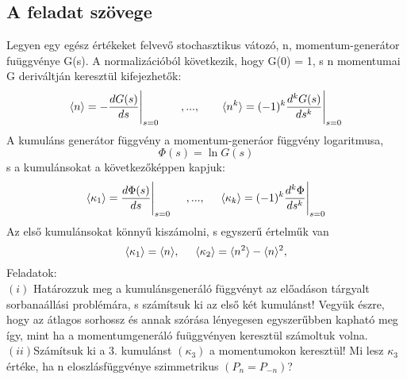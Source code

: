 \documentclass[12pt]{article}
\begin{document}
\subsection*{A feladat szövege}
Legyen egy egész értékeket felvevő stochasztikus vátozó, n, momentum-generátor fuüggvénye G(s). A normalizációból következik, hogy G(0) = 1, s n momentumai G deriváltján keresztül kifejezhetők:
$$\langle n\rangle = - \frac{dG(s)}{ds} \Bigg |_{\substack{ s=0 }}\hspace{0.7cm}, ...,\hspace{0.7cm} \langle n^k \rangle = (-1)^k\frac{d^kG(s)}{ds^k} \Bigg |_{\substack{ s=0 }}$$
A kumuláns generátor függvény a momentum-generáor függvény logaritmusa,
$$ \Phi (s) = \ln{G(s)}$$
s a kumulánsokat a következőképpen kapjuk:
$$\langle \kappa_1 \rangle = \frac{d\Phi(s)}{ds} \Bigg |_{\substack{ s=0 }} \hspace{0.5cm}, ..., \hspace{0.5cm} \langle \kappa_k \rangle = (-1)^k\frac{d^k\Phi}{ds^k}\Bigg |_{\substack{s = 0}}$$
Az első kumulánsokat könnyű kiszámolni, s egyszerű értelműk van
$$\langle \kappa_1\rangle = \langle n\rangle,  \hspace{0.5cm} \langle \kappa_2\rangle = \langle n^2\rangle -\langle n\rangle ^2,$$
Feladatok:\\
$(i)$ Határozzuk meg a kumulánsgeneráló függvényt az előadáson tárgyalt sorbanaállási problémára, s számítsuk ki az első két kumulánst! Vegyük észre, hogy az átlagos sorhossz és annak szórása lényegesen egyszerűbben kapható meg így, mint ha a momentumgeneráló fuüggvényen keresztül számoltuk volna.\\
$(ii)$Számítsuk ki a 3. kumulánst $(\kappa_3)$ a momentumokon keresztül! Mi lesz $\kappa_3$ értéke, ha n eloszlásfüggvénye szimmetrikus $ (P_n = P_{-n})$?
\end{document}
